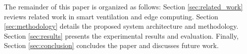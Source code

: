 The remainder of this paper is organized as follows: Section \ref{sec:related_work} reviews related work in smart ventilation and edge computing. Section \ref{sec:methodology} details the proposed system architecture and methodology. Section \ref{sec:results} presents the experimental results and evaluation. Finally, Section \ref{sec:conclusion} concludes the paper and discusses future work. 